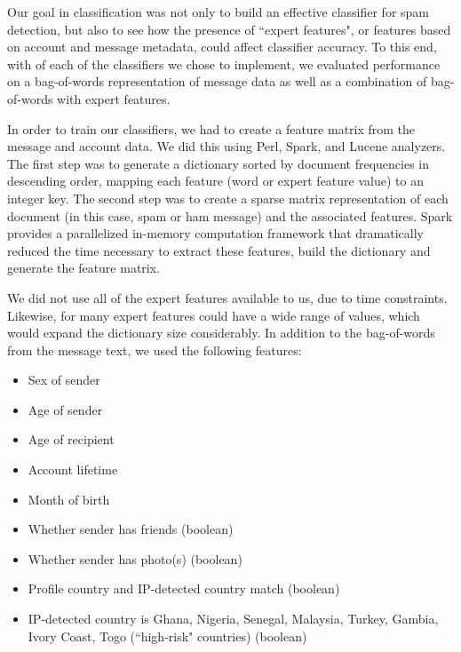 \documentclass[preprint]{acm_proc_article-sp}
\begin{document}
Our goal in classification was not only to build an effective classifier for spam detection, but also to see how the presence of ``expert features", or features based on account and message metadata, could affect classifier accuracy. To this end, with of each of the classifiers we chose to implement, we evaluated performance on a bag-of-words representation of message data as well as a combination of bag-of-words with expert features.

In order to train our classifiers, we had to create a feature matrix from the message and account data. We did this using 
Perl, Spark, and Lucene analyzers. The first step was to generate a dictionary sorted by document frequencies in descending 
order, mapping each feature (word or expert feature value) to an integer key. The second step was to create a sparse 
matrix representation of each document (in this case, spam or ham message) and the associated features. Spark provides a 
parallelized in-memory computation framework that dramatically reduced the time necessary to extract these features, 
build the dictionary and generate the feature matrix. 

We did not use all of the expert features available to us, due to time constraints. Likewise, for many expert features could 
have a wide range of values, which would expand the dictionary size considerably. In addition to the bag-of-words from the 
message text, we used the following features:
\begin{itemize}
\item Sex of sender
\item Age of sender
\item Age of recipient
\item Account lifetime
\item Month of birth 
\item Whether sender has friends (boolean)
\item Whether sender has photo(s) (boolean)
\item Profile country and IP-detected country match (boolean)
\item IP-detected country is Ghana, Nigeria, Senegal, Malaysia, Turkey, Gambia, Ivory Coast, Togo (``high-risk" countries) (boolean)
\end{itemize}

%
%
%
%
\end{document}
